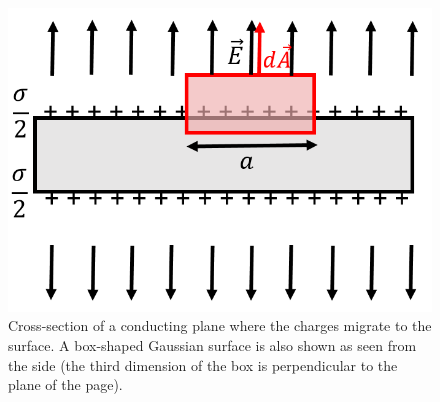 \begin{figure}[!htbp]
\centering
\includegraphics[width=0.4\linewidth]{files/fluxconductingplane-1c0be40aaf0892d7a87ea45a940a18c3.png}
\caption[]{Cross-section of a conducting plane where the charges migrate to the surface. A box-shaped Gaussian surface is also shown as seen from the side (the third dimension of the box is perpendicular to the plane of the page).}
\label{fig:gauss:fluxconductingplane}
\end{figure}

